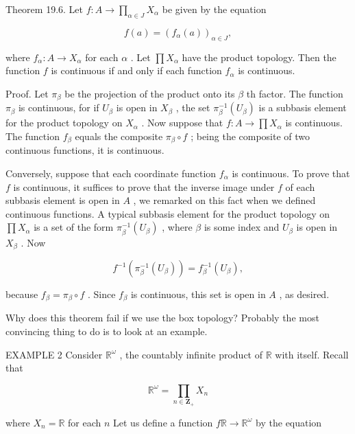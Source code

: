 \documentclass[10pt]{article}
\begin{document}
Theorem 19.6. Let \(f : A \rightarrow  \mathop{\prod }\limits_{{\alpha  \in  J}}{X}_{\alpha }\) be given by the equation

\[
f\left( a\right)  = {\left( {f}_{\alpha }\left( a\right) \right) }_{\alpha  \in  J},
\]

where \({f}_{\alpha } : A \rightarrow  {X}_{\alpha }\) for each \(\alpha\) . Let \(\prod {X}_{\alpha }\) have the product topology. Then the function \(f\) is continuous if and only if each function \({f}_{\alpha }\) is continuous.

Proof. Let \({\pi }_{\beta }\) be the projection of the product onto its \(\beta\) th factor. The function \({\pi }_{\beta }\) is continuous, for if \({U}_{\beta }\) is open in \({X}_{\beta }\) , the set \({\pi }_{\beta }^{-1}\left( {U}_{\beta }\right)\) is a subbasis element for the product topology on \({X}_{\alpha }\) . Now suppose that \(f : A \rightarrow  \prod {X}_{\alpha }\) is continuous. The function \({f}_{\beta }\) equals the composite \({\pi }_{\beta } \circ  f\) ; being the composite of two continuous functions, it is continuous.

Conversely, suppose that each coordinate function \({f}_{\alpha }\) is continuous. To prove that \(f\) is continuous, it suffices to prove that the inverse image under \(f\) of each subbasis element is open in \(A\) , we remarked on this fact when we defined continuous functions. A typical subbasis element for the product topology on \(\prod {X}_{\alpha }\) is a set of the form \({\pi }_{\beta }^{-1}\left( {U}_{\beta }\right)\) , where \(\beta\) is some index and \({U}_{\beta }\) is open in \({X}_{\beta }\) . Now

\[
{f}^{-1}\left( {{\pi }_{\beta }^{-1}\left( {U}_{\beta }\right) }\right)  = {f}_{\beta }^{-1}\left( {U}_{\beta }\right) ,
\]

because \({f}_{\beta } = {\pi }_{\beta } \circ  f\) . Since \({f}_{\beta }\) is continuous, this set is open in \(A\) , as desired.

Why does this theorem fail if we use the box topology? Probably the most convincing thing to do is to look at an example.

EXAMPLE 2 Consider \({\mathbb{R}}^{\omega }\) , the countably infinite product of \(\mathbb{R}\) with itself. Recall that

\[
{\mathbb{R}}^{\omega } = \mathop{\prod }\limits_{{n \in  {\mathbf{Z}}_{ + }}}{X}_{n}
\]

where \({X}_{n} = \mathbb{R}\) for each \(n\) Let us define a function \(f\mathbb{R} \rightarrow  {\mathbb{R}}^{\omega }\) by the equation
\end{document}

